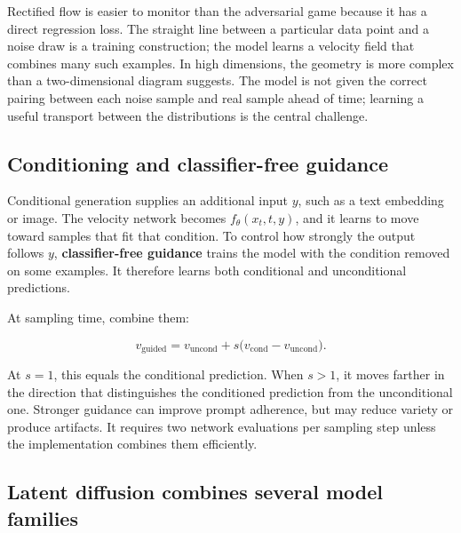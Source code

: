Rectified flow is easier to monitor than the adversarial game because it has a direct regression loss. The straight line between a particular data point and a noise draw is a training construction; the model learns a velocity field that combines many such examples. In high dimensions, the geometry is more complex than a two-dimensional diagram suggests. The model is not given the correct pairing between each noise sample and real sample ahead of time; learning a useful transport between the distributions is the central challenge.

\subsection{Conditioning and classifier-free guidance}\label{04-visual-computing-ii-ch031-conditioning-and-classifier-free-guidance}

\hypertarget{04-visual-computing-ii-ch031-conditioning-and-classifier-free-guidance}{}

Conditional generation supplies an additional input \(y\), such as a text embedding or image. The velocity network becomes \(f_\theta(x_t,t,y)\), and it learns to move toward samples that fit that condition. To control how strongly the output follows \(y\), \textbf{classifier-free guidance} trains the model with the condition removed on some examples. It therefore learns both conditional and unconditional predictions.

At sampling time, combine them:

\[
v_{\text{guided}}=v_{\text{uncond}}+s\big(v_{\text{cond}}-v_{\text{uncond}}\big).
\]

At \(s=1\), this equals the conditional prediction. When \(s>1\), it moves farther in the direction that distinguishes the conditioned prediction from the unconditional one. Stronger guidance can improve prompt adherence, but may reduce variety or produce artifacts. It requires two network evaluations per sampling step unless the implementation combines them efficiently.

\subsection{Latent diffusion combines several model families}\label{04-visual-computing-ii-ch031-latent-diffusion-combines-several-model-families}

\hypertarget{04-visual-computing-ii-ch031-latent-diffusion-combines-several-model-families}{}

